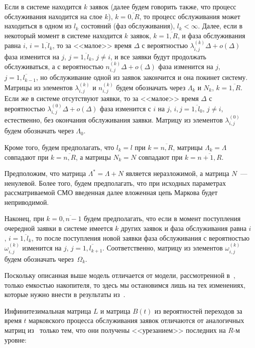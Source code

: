\begin{multicols}{2}
Если в системе находится $k$  заявок (далее
будем говорить также, что процесс обслуживания находится на
слое $k$), $k=\overline{0,R}$,
то процесс обслуживания может находиться в одном
из $l_k$  состояний (фаз обслуживания), $l_k<\infty$.
Далее, если в некоторый момент в системе находится $k$
 заявок, $k = \overline{1,R}$, и фаза обслуживания равна $i$,
$i=\overline{1,l_k}$, то
за <<малое>> время $\Delta$ с вероятностью
$\lambda^{(k)}_{i,j}\Delta + o(\Delta)$ фаза изменится на $j$,
$j=\overline{1,l_k}$, $j\ne i$, и все заявки будут продолжать
обслуживаться,
а с вероятностью $n^{(k)}_{i,j}\Delta + o(\Delta)$ фаза изменится
на $j$, $j=\overline{1,l_{k-1}}$, но обслуживание одной из
заявок закончится и она покинет систему. Матрицы из элементов
$\lambda^{(k)}_{i,j}$ и $n^{(k)}_{i,j}$ будем обозначать через
$\Lambda_k$ и $N_k$, $k =\overline{1,R}$.
Если же в системе отсутствуют заявки, то за <<малое>> время $\Delta$
с вероятностью $\lambda^{(0)}_{i,j}\Delta + o(\Delta)$ фаза изменится
с $i$ на $j$, $i,j=\overline{1,l_0}$, $j\ne i$, естественно,
без окончания обслуживания заявки.
Матрицу из элементов $\lambda^{(0)}_{i,j}$ будем обозначать через
$\Lambda_0$.

Кроме того, будем предполагать, что $l_k=l$ при
$k =\overline{n,R}$, матрицы $\Lambda_k = \Lambda$ совпадают при
$k =\overline{n,R}$, а матрицы $N_k = N$ совпадают при
$k =\overline{n+1,R}$.

Предположим, что матрица $\Lambda^* = \Lambda+N$ является неразложимой,
а матрица $N$~--- ненулевой.
Более того, будем предполагать, что при исходных
параметрах рассматриваемой СМО введенная далее вложенная цепь
Маркова будет неприводимой.

Наконец, при $k=\overline{0,n-1}$ будем предполагать, что если в
момент поступления очередной заявки в системе имеется $k$ других
заявок и фаза обслуживания равна $i$, $i=\overline{1,l_k}$, то
после поступления новой заявки фаза обслуживания с вероятностью
$\omega^{(k)}_{i,j}$ изменится на $j$, $j=\overline{1,l_{k+1}}$.
Соответственно, матрицу из элементов $\omega^{(k)}_{i,j}$ будем
обозначать через~$\Omega_k$.

Поскольку описанная выше модель отличается от модели, рассмотренной
в~\cite{PSCh06}, только емкостью накопителя,
то здесь мы остановимся лишь на тех изменениях, которые нужно
внести в результаты из~\cite{PSCh06}.

Инфинитезимальная матрица $L$ и матрица $B(t)$ из вероятностей
переходов за время $t$ марковского процесса обслуживания заявок
отличаются от аналогичных матриц из~\cite{PSCh06}
только тем, что они получены <<урезанием>> последних на $R$-м уровне:
\end{multicols}
